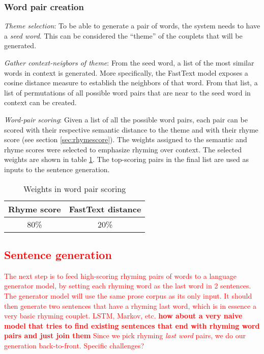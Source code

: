 \documentclass[11pt,a4paper]{article}
\newenvironment{tight_enumerate}{
\begin{enumerate}
\setlength{\itemsep}{0pt}
\setlength{\parskip}{0pt}
}{\end{enumerate}}
\begin{document}
\subsubsection{Word pair creation}
\begin{tight_enumerate}
	\item \textit{Theme selection}: To be able to generate a pair of words, the system needs to have a \textit{seed word}. This can be considered the ``theme'' of the couplets that will be generated.
	\item \textit{Gather context-neigbors of theme}: From the seed word, a list of the most similar words in context is generated. More specifically, the FastText model exposes a cosine distance measure to establish the neighbors of that word. From that list, a list of permutations of all possible word pairs that are near to the seed word in context can be created.
	\item \textit{Word-pair scoring}: Given a list of all the possible word pairs, each pair can be scored with their respective semantic distance to the theme and with their rhyme score (see section \ref{sec:rhymescore}). The weights assigned to the semantic and rhyme scores were selected to emphasize rhyming over context. The selected weights are shown in table \ref{table:weight_wordpair}. The top-scoring pairs in the final list are used as inputs to the sentence generation.
\begin{table}[ht]
\centering
\begin{tabular}{c c}
	\hline\hline
	Rhyme score & FastText distance\\ [0.5ex]
	\hline
	80\% & 20\% \\ [0.5ex]
	\hline
\end{tabular}
\caption{Weights in word pair scoring}
\label{table:weight_wordpair}
\end{table}
\end{tight_enumerate}

\textcolor{red}{
\subsection{Sentence generation}
\label{sec:languagegen}
The next step is to feed high-scoring rhyming pairs of words to a language generator model, by setting each rhyming word as the last word in 2 sentences. The generator model will use the same prose corpus as its only input. It should then generate two sentences that have a rhyming last word, which is in essence a very basic rhyming couplet.
LSTM, Markov, etc.
\textbf{how about a very naive model that tries to find existing sentences that end with rhyming word pairs and just join them}
Since we pick rhyming \textit{last word} pairs, we do our generation back-to-front. Specific challenges?
}
\end{document}
